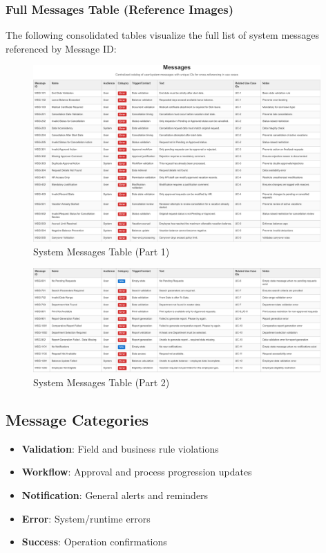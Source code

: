 \documentclass[12pt,a4paper]{article}
\begin{document}
\subsubsection{Full Messages Table (Reference Images)}
The following consolidated tables visualize the full list of system messages referenced by Message ID:

\begin{figure}[H]
\centering
\includegraphics[width=0.98\textwidth]{Use-Cases/Messages-Table/Messages-Table-1.png}
\caption{System Messages Table (Part 1)}
\label{fig:messages-table-1}
\end{figure}

\begin{figure}[H]
\centering
\includegraphics[width=0.98\textwidth]{Use-Cases/Messages-Table/Messages-Table-2.png}
\caption{System Messages Table (Part 2)}
\label{fig:messages-table-2}
\end{figure}

\subsection{Message Categories}
\begin{itemize}
    \item \textbf{Validation}: Field and business rule violations
    \item \textbf{Workflow}: Approval and process progression updates
    \item \textbf{Notification}: General alerts and reminders
    \item \textbf{Error}: System/runtime errors
    \item \textbf{Success}: Operation confirmations
\end{itemize}
\end{document}
